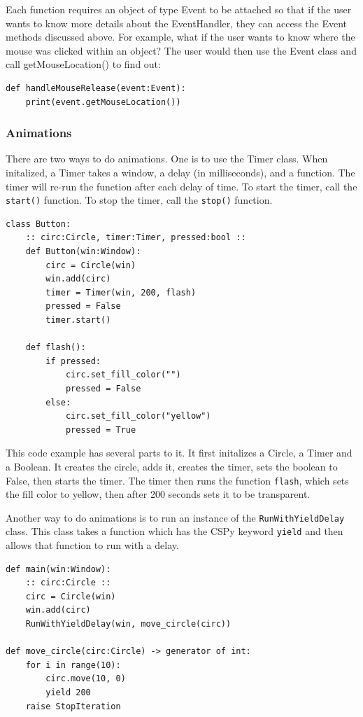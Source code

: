 \documentclass{article}
\begin{document}
Each function requires an object of type Event to be attached so that if the user wants to know more details about the EventHandler, they can access the Event methods discussed above. For example, what if the user wants to know where the mouse was clicked within an object? The user would then use the Event class and call getMouseLocation() to find out:

\begin{verbatim}
def handleMouseRelease(event:Event):
    print(event.getMouseLocation())
\end{verbatim}

\subsubsection{Animations}

There are two ways to do animations. One is to use the Timer class. When initalized, a Timer takes a window, a delay (in milliseconds), and a function. The timer will re-run the function after each delay of time. To start the timer, call the \verb|start()| function. To stop the timer, call the \verb|stop()| function.

\begin{verbatim}
class Button:
    :: circ:Circle, timer:Timer, pressed:bool ::
    def Button(win:Window):
        circ = Circle(win)
        win.add(circ)
        timer = Timer(win, 200, flash)
        pressed = False
        timer.start()

    def flash():
        if pressed:
            circ.set_fill_color("")
            pressed = False
        else:
            circ.set_fill_color("yellow")
            pressed = True
\end{verbatim}

This code example has several parts to it. It first initalizes a Circle, a Timer and a Boolean. It creates the circle, adds it, creates the timer, sets the boolean to False, then starts the timer. The timer then runs the function \verb|flash|, which sets the fill color to yellow, then after 200 seconds sets it to be transparent.

Another way to do animations is to run an instance of the \verb|RunWithYieldDelay| class. This class takes a function which has the CSPy keyword \verb|yield| and then allows that function to run with a delay.

\begin{verbatim}
def main(win:Window):
    :: circ:Circle ::
    circ = Circle(win)
    win.add(circ)
    RunWithYieldDelay(win, move_circle(circ))

def move_circle(circ:Circle) -> generator of int:
    for i in range(10):
        circ.move(10, 0)
        yield 200
    raise StopIteration
\end{verbatim}
\end{document}
